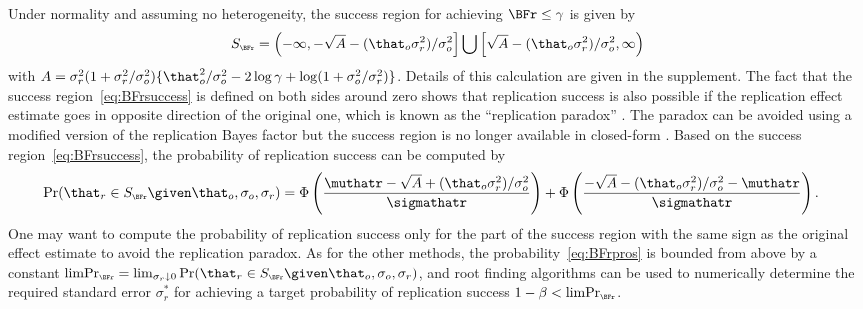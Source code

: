 Under normality and assuming no heterogeneity, the success region for achieving
$\BFr \leq \gamma$ is given by
\begin{align}
  \label{eq:BFrsuccess}
  S_{\scriptscriptstyle \BFr}
  = \left(-\infty, -\sqrt{A} - (\that_{o}\sigma^{2}_{r})/\sigma^{2}_{o}\right] \bigcup
   \left[\sqrt{A} - (\that_{o}\sigma^{2}_{r})/\sigma^{2}_{o}, \infty\right)
\end{align}
with
$A = \sigma^{2}_{r}(1 + \sigma^{2}_{r}/\sigma^{2}_{o}) \{\that_{o}^{2}/\sigma^{2}_{o} - 2 \log \gamma + \log(1 + \sigma^{2}_{o}/\sigma^{2}_{r})\}$.
Details of this calculation are given in the supplement. The fact that the
success region~\eqref{eq:BFrsuccess} is defined on both sides around zero shows
that replication success is also possible if the replication effect estimate
goes in opposite direction of the original one, which is known as the
``replication paradox'' \citep{Ly2018}. The paradox can be avoided using a
modified version of the replication Bayes factor but the success region is no
longer available in closed-form \citep[Appendix D]{Pawel2022b}. Based on the
success region~\eqref{eq:BFrsuccess}, the probability of replication success can
be computed by
\begin{align}
  \label{eq:BFrpros}
  \Pr(\that_{r} \in S_{\scriptscriptstyle \BFr} \given \that_{o}, \sigma_{o}, \sigma_{r})
  &=%
      \Phi\left(\frac{\muthatr - \sqrt{A} + (\that_{o}\sigma^{2}_{r})/\sigma^{2}_{o}}{
      \sigmathatr}\right)
    + \Phi\left(\frac{-\sqrt{A} - (\that_{o}\sigma^{2}_{r})/\sigma^{2}_{o}
- \muthatr}{\sigmathatr}\right).
\end{align}
One may want to compute the probability of replication success only for the part
of the success region with the same sign as the original effect estimate to
avoid the replication paradox. As for the other methods, the
probability~\eqref{eq:BFrpros} is bounded from above by a constant
$\text{limPr}_{\scriptscriptstyle \BFr} = \lim_{\sigma_{r} \downarrow 0} \Pr(\that_r \in S_{\scriptscriptstyle \BFr} \given \that_{o}, \sigma_{o}, \sigma_{r})$,
and root finding algorithms can be used to numerically determine the required
standard error $\sigma^{*}_{r}$ for achieving a target probability of
replication success $1 - \beta < \text{limPr}_{\scriptscriptstyle \BFr}$.

